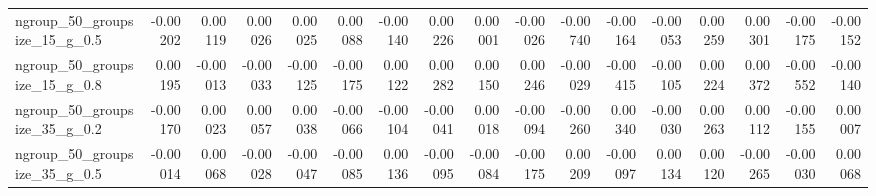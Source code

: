 \documentclass[10pt, a4paper, titlepage]{article}
\begin{document}
\begin{landscape}
\begin{table}[]
{\begin{tabular}{l|rrrr|rrrr|rrrr|rrrr}
ngroup\_50\_groupsize\_15\_g\_0.5 & -0.00202                          & 0.00119                            & 0.00026                            & 0.00025                                 & 0.00088                           & -0.00140                           & 0.00226                            & 0.00001                                 & -0.00026                          & -0.00740                           & -0.00164                           & -0.00053                                & 0.00259                           & 0.00301                            & -0.00175                           & -0.00152                               \\
ngroup\_50\_groupsize\_15\_g\_0.8 & 0.00195                           & -0.00013                           & -0.00033                           & -0.00125                                & -0.00175                          & 0.00122                            & 0.00282                            & 0.00150                                 & 0.00246                           & -0.00029                           & -0.00415                           & -0.00105                                & 0.00224                           & 0.00372                            & -0.00552                           & -0.00140                               \\
ngroup\_50\_groupsize\_35\_g\_0.2 & -0.00170                          & 0.00023                            & 0.00057                            & 0.00038                                 & -0.00066                          & -0.00104                           & -0.00041                           & 0.00018                                 & -0.00094                          & -0.00260                           & 0.00340                            & -0.00030                                & 0.00263                           & 0.00112                            & -0.00155                           & 0.00007                                \\
ngroup\_50\_groupsize\_35\_g\_0.5 & -0.00014                          & 0.00068                            & -0.00028                           & -0.00047                                & -0.00085                          & 0.00136                            & -0.00095                           & -0.00084                                & -0.00175                          & 0.00209                            & -0.00097                           & 0.00134                                 & 0.00120                           & -0.00265                           & -0.00030                           & 0.00068                                \\

\end{tabular}}
\end{table}
\end{landscape}
\end{document}
